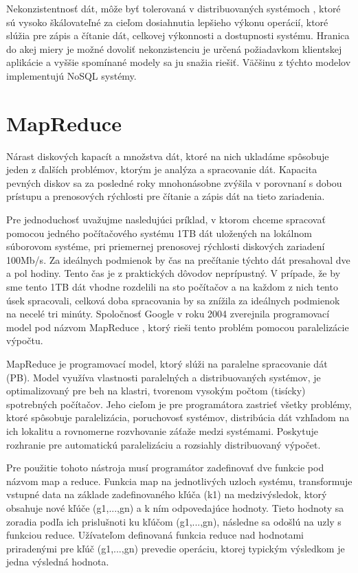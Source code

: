 \documentclass[11pt,twoside,a4paper]{book}
\begin{document}
Nekonzistentnosť dát, môže byť tolerovaná v distribuovaných systémoch , ktoré sú vysoko škálovateľné za cieľom dosiahnutia lepšieho výkonu operácií, ktoré slúžia pre zápis a čítanie dát, celkovej výkonnosti a dostupnosti systému. Hranica do akej miery je možné dovoliť nekonzistenciu je určená požiadavkom klientskej aplikácie a vyššie spomínané modely sa ju snažia riešiť. Väčšinu z týchto modelov implementujú NoSQL systémy.


\section{MapReduce}
Nárast diskových kapacít a množstva dát, ktoré na nich ukladáme spôsobuje jeden z ďalších problémov, ktorým je analýza a spracovanie dát. Kapacita pevných diskov sa za posledné roky mnohonásobne zvýšila v porovnaní s dobou prístupu a prenosových rýchlosti pre čítanie a zápis dát na tieto zariadenia.

Pre jednoduchosť uvažujme nasledujúci príklad, v ktorom chceme spracovať pomocou jedného počítačového systému 1TB dát uložených na lokálnom súborovom systéme, pri priemernej prenosovej rýchlosti diskových zariadení 100Mb/s. Za ideálnych podmienok by čas na prečítanie týchto dát presahoval dve a pol hodiny. Tento čas je z praktických dôvodov neprípustný. V prípade, že by sme tento 1TB dát vhodne rozdelili na sto počítačov a na každom z nich tento úsek spracovali, celková doba spracovania by sa znížila za ideálnych podmienok na necelé tri minúty. Spoločnosť Google v roku 2004 zverejnila programovací model pod názvom MapReduce \cite{mapreduce}, ktorý rieši tento problém pomocou paralelizácie výpočtu.

MapReduce je programovací model, ktorý slúži na paralelne spracovanie dát (PB). Model využíva vlastnosti paralelných a distribuovaných systémov, je optimalizovaný pre beh na klastri, tvorenom vysokým počtom (tisícky) spotrebných počítačov. Jeho cieľom je pre programátora zastrieť všetky problémy, ktoré spôsobuje paralelizácia, poruchovosť systémov, distribúcia dát vzhľadom na ich lokalitu a rovnomerne rozvhovanie záťaže medzi systémami. Poskytuje rozhranie pre automatickú paralelizáciu a rozsiahly distribuovaný výpočet.

Pre použitie tohoto nástroja musí programátor zadefinovať dve funkcie pod názvom map a reduce. Funkcia map na jednotlivých uzloch systému, transformuje vstupné data na základe zadefinovaného kľúča (k1) na medzivýsledok, ktorý obsahuje nové kľúče (g1,...,gn) a k ním odpovedajúce hodnoty. Tieto hodnoty sa zoradia podľa ich prislušnoti ku kľúčom (g1,...,gn), následne sa odošlú na uzly s funkciou reduce. Užívateľom definovaná funkcia reduce nad hodnotami priradenými pre kľúč (g1,...,gn) prevedie operáciu, ktorej typickým výsledkom je jedna výsledná hodnota.
\end{document}
